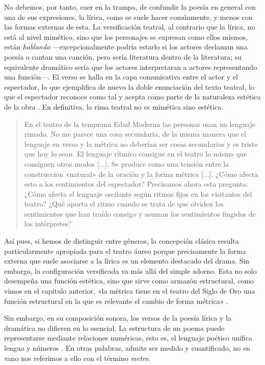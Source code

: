 No debemos, por tanto, caer en la trampa, de confundir la poesía en general con una de sus expresiones, la lírica, como se suele hacer comúnmente, y menos con las formas externas de esta. La versificación teatral, al contrario que la lírica, no está al nivel mimético, sino que los personajes se expresan como ellos mismos, están \textit{hablando} —excepcionalmente podría estarlo si los actores declaman una poesía o cantan una canción, pero sería literatura dentro de la literatura; su equivalente dramático sería que los actores interpretaran a actores representando una función—. El verso se halla en la capa comunicativa entre el actor y el espectador, lo que ejemplifica de nuevo la doble enunciación del texto teatral, lo que el espectador reconoce como tal y acepta como parte de la naturaleza estética de la obra \parencite[618]{schaeffer1995}. En definitiva, la rima teatral no es mimética sino estética.

\blockquote{En el teatro de la temprana Edad Moderna las personas usan un lenguaje rimado. No me parece una cosa secundaria, de la misma manera que el lenguaje en verso y la métrica no deberían ser cosas secundarias y es triste que hoy lo sean. El lenguaje rítmico consigue en el teatro lo mismo que consiguen otros modos [...]. Se produce como una tensión entre la construcción «natural» de la oración y la forma métrica [...]. ¿Cómo afecta esto a los sentimientos del espectador? Precisamos ahora esta pregunta: ¿Cómo afecta el lenguaje oscilante según ritmos fijos en los visitantes del teatro? ¿Qué aporta el ritmo cuando se trata de que olviden los sentimientos que han traído consigo y asuman los sentimientos fingidos de los intérpretes? \parencite[p. 133; traducción propia]{aichinger2013b}}

Así pues, si hemos de distinguir entre géneros, la concepción clásica resulta particularmente apropiada para el teatro áureo porque precisamente la forma externa que suele asociarse a la lírica es un elemento destacado del drama. Sin embargo, la configuración versificada va más allá del simple adorno. Esta no solo desempeña una función estética, sino que sirve como armazón estructural, como vimos en el capítulo anterior, «la métrica tiene en el teatro del Siglo de Oro una función estructural en la que es relevante el cambio de forma métrica» \parencite[68]{arellano2007}.

Sin embargo, en su composición sonora, los versos de la poesía lírica y la dramática no difieren en lo esencial. La estructura de un poema puede representarse mediante relaciones numéricas, esto es, el lenguaje poético unifica lengua y números  \parencite[45]{aichinger2013b}. En otras palabras, admite ser medido y cuantificado, no en vano nos referimos a ello con el término \textit{metro}.

